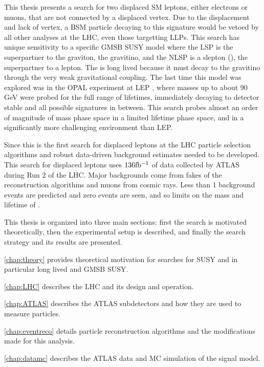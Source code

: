 This thesis presents a search for two displaced \ac{SM} leptons, either electrons or muons, that are not connected by a displaced vertex. Due to the displacement and lack of vertex, a \ac{BSM} particle decaying to this signature would be vetoed by all other analyses at the \ac{LHC}, even those targetting \acp{LLP}. This search has unique sensitivity to a specific \acf{GMSB} \acf{SUSY} model where the \acf{LSP} is the superpartner to the graviton, the gravitino, and the \acf{NLSP} is a slepton (\slep), the superpartner to a lepton. The \slep is long lived because it must decay to the gravitino through the very weak gravitational coupling. The last time this model was explored was in the OPAL experiment at \acf{LEP} \cite{opal}, where masses up to about 90 GeV were probed for the full range of lifetimes, immediately decaying to detector stable and all possible signatures in between. This search probes almost an order of magnitude of mass phase space in a limited lifetime phase space, and in a significantly more challenging environment than \ac{LEP}.

Since this is the first search for displaced leptons at the \ac{LHC} particle selection algorithms and robust data-driven background estimates needed to be developed. This search for displaced leptons uses $136 \mbox{fb\(^{-1}\)}$ of data collected by \ac{ATLAS} during Run 2 of the \ac{LHC}. Major backgrounds come from fakes of the reconstruction algorithms and muons from cosmic rays. Less than 1 background events are predicted and zero events are seen, and so limits on the mass and lifetime of \slep. 

This thesis is organized into three main sections: first the search is motivated theoretically, then the experimental setup is described, and finally the search strategy and its results are presented.

\autoref{chap:theory} provides theoretical motivation for searches for \ac{SUSY} and in particular long lived and \ac{GMSB} \ac{SUSY}.

\autoref{chap:LHC} describes the \ac{LHC} and its design and operation.

\autoref{chap:ATLAS} describes the \ac{ATLAS} subdetectors and how they are used to measure particles.

\autoref{chap:eventreco} details particle reconstruction algorithms and the modifications made for this analysis.

\autoref{chap:datamc} describes the \ac{ATLAS} data and \acf{MC} simulation of the signal model.


